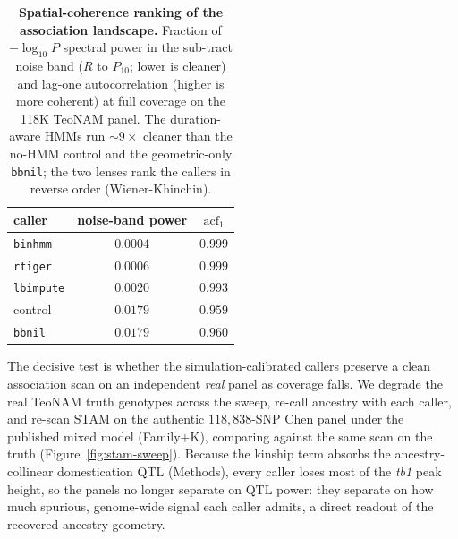 \documentclass[9pt,twocolumn,twoside]{rilabRxiv}
\newcommand{\bbnil}{\texttt{bbnil}\xspace}
\newcommand{\rtiger}{\texttt{rtiger}\xspace}
\newcommand{\binhmm}{\texttt{binhmm}\xspace}
\newcommand{\lbimpute}{\texttt{lbimpute}\xspace}
\begin{document}
\begin{table}[tb]
\centering
\small
\begin{tabular}{@{}l c c@{}}
\toprule
caller & noise-band power & $\mathrm{acf}_1$ \\
\midrule
\binhmm    & $0.0004$ & $0.999$ \\
\rtiger    & $0.0006$ & $0.999$ \\
\lbimpute & $0.0020$ & $0.993$ \\
control   & $0.0179$ & $0.959$ \\
\bbnil     & $0.0179$ & $0.960$ \\
\bottomrule
\end{tabular}
\caption{\textbf{Spatial-coherence ranking of the association landscape.}
Fraction of $-\log_{10}P$ spectral power in the sub-tract noise band ($R$ to
$P_{10}$; lower is cleaner) and lag-one autocorrelation (higher is more coherent) at
full coverage on the 118K TeoNAM panel. The duration-aware HMMs run ${\sim}9\times$
cleaner than the no-HMM control and the geometric-only \bbnil; the two lenses rank the
callers in reverse order (Wiener-Khinchin).}
\label{tab:ranking}
\end{table}

The decisive test is whether the simulation-calibrated callers preserve a clean
association scan on an independent \emph{real} panel as coverage falls. We degrade the
real TeoNAM truth genotypes across the sweep, re-call ancestry with each caller, and
re-scan STAM on the authentic $118{,}838$-SNP Chen panel under the published mixed
model (Family$+$K), comparing against the same scan on the truth
(Figure~\ref{fig:stam-sweep}). Because the kinship term absorbs the ancestry-collinear
domestication QTL (Methods), every caller loses most of the \textit{tb1} peak height,
so the panels no longer separate on QTL power: they separate on how much spurious,
genome-wide signal each caller admits, a direct readout of the recovered-ancestry
geometry.
\end{document}

